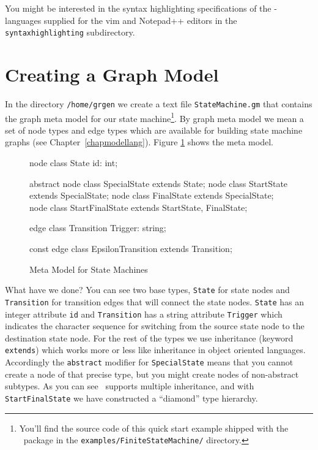 \begin{note}
You might be interested in the syntax highlighting specifications of the \GrG-languages supplied for the vim and Notepad++ editors in the \texttt{syntaxhighlighting} subdirectory.
\end{note}

\section{Creating a Graph Model}
In the directory \texttt{/home/grgen} we create a text file \texttt{StateMachine.gm} that contains the graph meta model for our state machine\footnote{You'll find the source code of this quick start example shipped with the \GrG\ package in the \texttt{examples/FiniteStateMachine/} directory.}.
By graph meta model we mean a set of node types and edge types which are available for building state machine graphs (see Chapter~\ref{chapmodellang}).
Figure \ref{fig:quick:mm} shows the meta model.
\begin{figure}[htbp]
    \centering
    \begin{grgen}
node class State {
    id: int;
}

abstract node class SpecialState extends State;
node class StartState extends SpecialState;
node class FinalState extends SpecialState;
node class StartFinalState extends StartState, FinalState;

edge class Transition {
    Trigger: string;
}

const edge class EpsilonTransition extends Transition;    
    \end{grgen}
    \caption{Meta Model for State Machines}
    \label{fig:quick:mm}
\end{figure}    
What have we done?
You can see two base types, \texttt{State} for state nodes and \texttt{Transition} for transition edges that will connect the state nodes.
\texttt{State} has an integer attribute \texttt{id} and \texttt{Transition} has a string attribute \texttt{Trigger} which indicates the character sequence for switching from the source state node to the destination state node.
For the rest of the types we use inheritance (keyword \texttt{extends}) which works more or less like inheritance in object oriented languages.
Accordingly the \texttt{abstract} modifier for \texttt{SpecialState} means that you cannot create a node of that precise type, but you might create nodes of non-abstract subtypes.
As you can see \GrG\ supports multiple inheritance, and with \texttt{StartFinalState} we have constructed a ``diamond'' type hierarchy.

